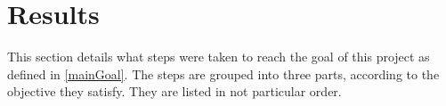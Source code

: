 \section{Results}
This section details what steps were taken to reach the goal of this project as defined in \ref{mainGoal}. The steps are grouped into three parts, according to the objective they satisfy. They are listed in not particular order.



